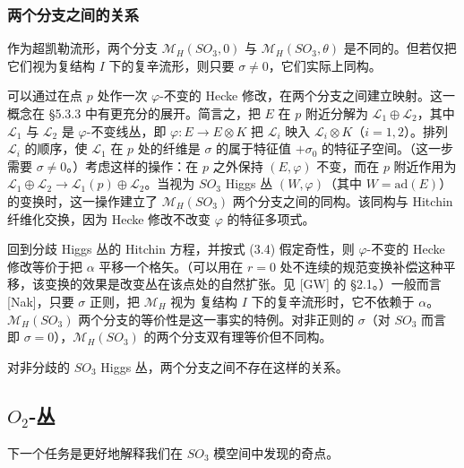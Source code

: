 \documentclass[11pt,a4paper]{article}
\begin{document}
\subsubsection{两个分支之间的关系}

作为超凯勒流形，两个分支 $\mathcal{M}_H(SO_3,0)$ 与 $\mathcal{M}_H(SO_3,\theta)$ 是不同的。但若仅把它们视为复结构 $I$ 下的复辛流形，则只要 $\sigma\ne0$，它们实际上同构。

可以通过在点 $p$ 处作一次 $\varphi$-不变的 Hecke 修改，在两个分支之间建立映射。这一概念在 §5.3.3 中有更充分的展开。简言之，把 $E$ 在 $p$ 附近分解为 $\mathcal{L}_1\oplus\mathcal{L}_2$，其中 $\mathcal{L}_1$ 与 $\mathcal{L}_2$ 是 $\varphi$-不变线丛，即 $\varphi:E\to E\otimes K$ 把 $\mathcal{L}_i$ 映入 $\mathcal{L}_i\otimes K$（$i=1,2$）。排列 $\mathcal{L}_i$ 的顺序，使 $\mathcal{L}_1$ 在 $p$ 处的纤维是 $\sigma$ 的属于特征值 $+\sigma_0$ 的特征子空间。（这一步需要 $\sigma\ne0$。）考虑这样的操作：在 $p$ 之外保持 $(E,\varphi)$ 不变，而在 $p$ 附近作用为 $\mathcal{L}_1\oplus\mathcal{L}_2\to\mathcal{L}_1(p)\oplus\mathcal{L}_2$。当视为 $SO_3$ Higgs 丛 $(W,\varphi)$（其中 $W=\mathrm{ad}(E)$）的变换时，这一操作建立了 $\mathcal{M}_H(SO_3)$ 两个分支之间的同构。该同构与 Hitchin 纤维化交换，因为 Hecke 修改不改变 $\varphi$ 的特征多项式。

回到分歧 Higgs 丛的 Hitchin 方程，并按式 (3.4) 假定奇性，则 $\varphi$-不变的 Hecke 修改等价于把 $\alpha$ 平移一个格矢。（可以用在 $r=0$ 处不连续的规范变换补偿这种平移，该变换的效果是改变丛在该点处的自然扩张。见 [GW] 的 §2.1。）一般而言 [Nak]，只要 $\sigma$ 正则，把 $\mathcal{M}_H$ 视为
复结构 $I$ 下的复辛流形时，它不依赖于 $\alpha$。$\mathcal{M}_H(SO_3)$ 两个分支的等价性是这一事实的特例。对非正则的 $\sigma$（对 $SO_3$ 而言即 $\sigma=0$），$\mathcal{M}_H(SO_3)$ 的两个分支双有理等价但不同构。

对非分歧的 $SO_3$ Higgs 丛，两个分支之间不存在这样的关系。

\subsection{\texorpdfstring{$O_2$}{O2}-丛}

下一个任务是更好地解释我们在 $SO_3$ 模空间中发现的奇点。
\end{document}
